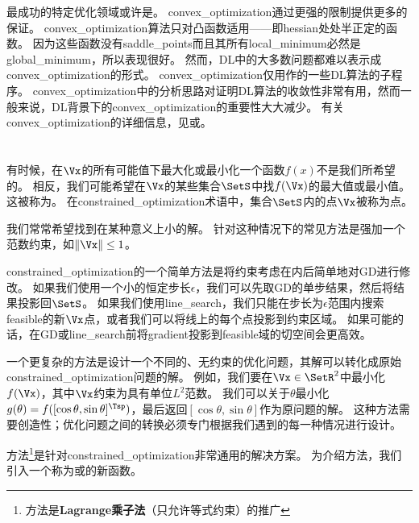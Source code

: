 最成功的特定优化领域或许是。
\gls{convex_optimization}通过更强的限制提供更多的保证。
\gls{convex_optimization}算法只对凸函数适用——即\gls{hessian}处处半正定的函数。
因为这些函数没有\gls{saddle_points}而且其所有\gls{local_minimum}必然是\gls{global_minimum}，所以表现很好。
然而，\gls{DL}中的大多数问题都难以表示成\gls{convex_optimization}的形式。
\gls{convex_optimization}仅用作的一些\gls{DL}算法的子程序。
\gls{convex_optimization}中的分析思路对证明\gls{DL}算法的收敛性非常有用，然而一般来说，\gls{DL}背景下的\gls{convex_optimization}的重要性大大减少。 
有关\gls{convex_optimization}的详细信息，见\cite{Boyd04}或\cite{rockafellar1997convex}。


\section{}
\label{sec:constrained_optimization}
有时候，在$\Vx$的所有可能值下最大化或最小化一个函数$f(x)$不是我们所希望的。
相反，我们可能希望在$\Vx$的某些集合$\SetS$中找$f(\Vx)$的最大值或最小值。
这被称为。
在\gls{constrained_optimization}术语中，集合$\SetS$内的点$\Vx$被称为点。

我们常常希望找到在某种意义上小的解。
针对这种情况下的常见方法是强加一个范数约束，如$\| \Vx \| \leq 1$。

\gls{constrained_optimization}的一个简单方法是将约束考虑在内后简单地对\gls{GD}进行修改。
如果我们使用一个小的恒定步长$\epsilon$，我们可以先取\gls{GD}的单步结果，然后将结果投影回$\SetS$。
如果我们使用\gls{line_search}，我们只能在步长为$\epsilon$范围内搜索\gls{feasible}的新$\Vx$点，或者我们可以将线上的每个点投影到约束区域。
如果可能的话，在\gls{GD}或\gls{line_search}前将\gls{gradient}投影到\gls{feasible}域的切空间会更高效\citep{rosen1960}。

一个更复杂的方法是设计一个不同的、无约束的优化问题，其解可以转化成原始\gls{constrained_optimization}问题的解。
例如，我们要在$\Vx \in \SetR^2$中最小化$f(\Vx)$，其中$\Vx$约束为具有单位$L^2$范数。
我们可以关于$\theta$最小化$g(\theta) = f([\cos \theta, \sin \theta]^\Tsp)$，最后返回$[\cos \theta, \sin \theta]$作为原问题的解。
这种方法需要创造性；优化问题之间的转换必须专门根据我们遇到的每一种情况进行设计。


方法\footnote{方法是\textbf{Lagrange乘子法}（只允许等式约束）的推广}是针对\gls{constrained_optimization}非常通用的解决方案。
为介绍方法，我们引入一个称为或的新函数。

